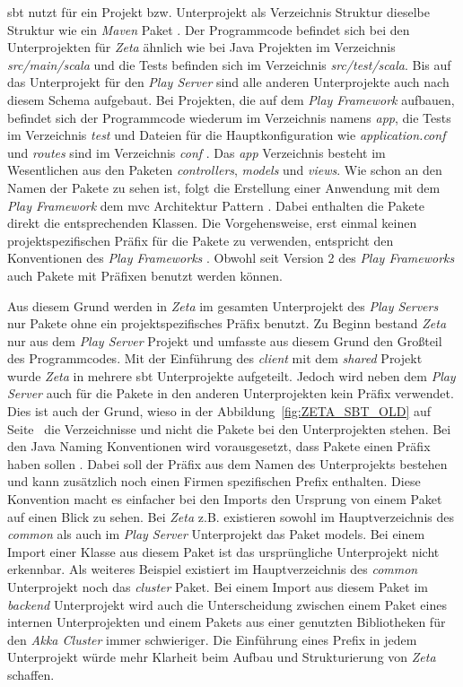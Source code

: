 \ac{sbt} nutzt für ein Projekt bzw. Unterprojekt als Verzeichnis Struktur dieselbe Struktur wie ein \textit{Maven} Paket \cite{sbt_directories}. Der Programmcode befindet sich bei den Unterprojekten für \textit{Zeta} ähnlich wie bei Java Projekten im Verzeichnis \textit{src/main/scala} und die Tests befinden sich im Verzeichnis \textit{src/test/scala}. Bis auf das Unterprojekt für den \textit{Play Server} sind alle anderen Unterprojekte auch nach diesem Schema aufgebaut. Bei Projekten, die auf dem \textit{Play Framework} aufbauen, befindet sich der Programmcode wiederum im Verzeichnis namens \textit{app}, die Tests im Verzeichnis \textit{test} und Dateien für die Hauptkonfiguration wie \textit{application.conf} und \textit{routes} sind im Verzeichnis \textit{conf} \cite{play_framework_anatomy}. Das \textit{app} Verzeichnis besteht im Wesentlichen aus den Paketen \textit{controllers}, \textit{models} und \textit{views}. Wie schon an den Namen der Pakete zu sehen ist, folgt die Erstellung einer Anwendung mit dem \textit{Play Framework} dem \ac{mvc} Architektur Pattern \cite{play_main_concept}. Dabei enthalten die Pakete direkt die entsprechenden Klassen. Die Vorgehensweise, erst einmal keinen projektspezifischen Präfix für die Pakete zu verwenden, entspricht den Konventionen des \textit{Play Frameworks} \cite{play_framework_anatomy}. Obwohl seit Version 2 des \textit{Play Frameworks} auch Pakete mit Präfixen benutzt werden können.

Aus diesem Grund werden in \textit{Zeta} im gesamten Unterprojekt des \textit{Play Servers} nur Pakete ohne ein projektspezifisches Präfix benutzt. Zu Beginn bestand \textit{Zeta} nur aus dem \textit{Play Server} Projekt und umfasste aus diesem Grund den Großteil des Programmcodes. Mit der Einführung des \textit{client} mit dem \textit{shared} Projekt wurde \textit{Zeta} in mehrere \ac{sbt} Unterprojekte aufgeteilt. Jedoch wird neben dem \textit{Play Server} auch für die Pakete in den anderen Unterprojekten kein Präfix verwendet. Dies ist auch der Grund, wieso in der Abbildung~\ref{fig:ZETA_SBT_OLD} auf Seite~\pageref{fig:ZETA_SBT_OLD} die Verzeichnisse und nicht die Pakete bei den Unterprojekten stehen. Bei den Java Naming Konventionen wird vorausgesetzt, dass Pakete einen Präfix haben sollen \cite{java_package_naming}. Dabei soll der Präfix aus dem Namen des Unterprojekts bestehen und kann zusätzlich noch einen Firmen spezifischen Prefix enthalten. Diese Konvention macht es einfacher bei den Imports den Ursprung von einem Paket auf einen Blick zu sehen. Bei \textit{Zeta} z.B. existieren sowohl im Hauptverzeichnis des \textit{common} als auch im \textit{Play Server} Unterprojekt das Paket models. Bei einem Import einer Klasse aus diesem Paket ist das ursprüngliche Unterprojekt nicht erkennbar. Als weiteres Beispiel existiert im Hauptverzeichnis des \textit{common} Unterprojekt noch das \textit{cluster} Paket. Bei einem Import aus diesem Paket im \textit{backend} Unterprojekt wird auch die Unterscheidung zwischen einem Paket eines internen Unterprojekten und einem Pakets aus einer genutzten Bibliotheken für den \textit{Akka Cluster} immer schwieriger. Die Einführung eines Prefix in jedem Unterprojekt würde mehr Klarheit beim Aufbau und Strukturierung von \textit{Zeta} schaffen.

